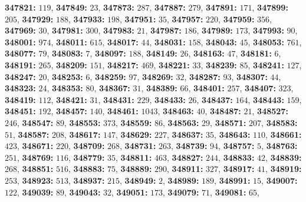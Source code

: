 \textsf{\bfseries 347821:} $119$, \textsf{\bfseries 347849:} $23$, \textsf{\bfseries 347873:} $287$, \textsf{\bfseries 347887:} $279$, \textsf{\bfseries 347891:} $171$, \textsf{\bfseries 347899:} $205$, \textsf{\bfseries 347929:} $188$, \textsf{\bfseries 347933:} $198$, \textsf{\bfseries 347951:} $35$, \textsf{\bfseries 347957:} $220$, \textsf{\bfseries 347959:} $356$, \textsf{\bfseries 347969:} $30$, \textsf{\bfseries 347981:} $300$, \textsf{\bfseries 347983:} $21$, \textsf{\bfseries 347987:} $186$, \textsf{\bfseries 347989:} $173$, \textsf{\bfseries 347993:} $90$, \textsf{\bfseries 348001:} $974$, \textsf{\bfseries 348011:} $615$, \textsf{\bfseries 348017:} $44$, \textsf{\bfseries 348031:} $158$, \textsf{\bfseries 348043:} $45$, \textsf{\bfseries 348053:} $761$, \textsf{\bfseries 348077:} $79$, \textsf{\bfseries 348083:} $7$, \textsf{\bfseries 348097:} $188$, \textsf{\bfseries 348149:} $26$, \textsf{\bfseries 348163:} $47$, \textsf{\bfseries 348181:} $6$, \textsf{\bfseries 348191:} $265$, \textsf{\bfseries 348209:} $151$, \textsf{\bfseries 348217:} $469$, \textsf{\bfseries 348221:} $33$, \textsf{\bfseries 348239:} $85$, \textsf{\bfseries 348241:} $127$, \textsf{\bfseries 348247:} $20$, \textsf{\bfseries 348253:} $6$, \textsf{\bfseries 348259:} $97$, \textsf{\bfseries 348269:} $32$, \textsf{\bfseries 348287:} $93$, \textsf{\bfseries 348307:} $44$, \textsf{\bfseries 348323:} $24$, \textsf{\bfseries 348353:} $80$, \textsf{\bfseries 348367:} $31$, \textsf{\bfseries 348389:} $66$, \textsf{\bfseries 348401:} $257$, \textsf{\bfseries 348407:} $323$, \textsf{\bfseries 348419:} $112$, \textsf{\bfseries 348421:} $31$, \textsf{\bfseries 348431:} $229$, \textsf{\bfseries 348433:} $26$, \textsf{\bfseries 348437:} $164$, \textsf{\bfseries 348443:} $159$, \textsf{\bfseries 348451:} $192$, \textsf{\bfseries 348457:} $140$, \textsf{\bfseries 348461:} $1043$, \textsf{\bfseries 348463:} $40$, \textsf{\bfseries 348487:} $21$, \textsf{\bfseries 348527:} $246$, \textsf{\bfseries 348547:} $89$, \textsf{\bfseries 348553:} $373$, \textsf{\bfseries 348559:} $86$, \textsf{\bfseries 348563:} $29$, \textsf{\bfseries 348571:} $207$, \textsf{\bfseries 348583:} $51$, \textsf{\bfseries 348587:} $208$, \textsf{\bfseries 348617:} $147$, \textsf{\bfseries 348629:} $227$, \textsf{\bfseries 348637:} $35$, \textsf{\bfseries 348643:} $110$, \textsf{\bfseries 348661:} $423$, \textsf{\bfseries 348671:} $220$, \textsf{\bfseries 348709:} $268$, \textsf{\bfseries 348731:} $263$, \textsf{\bfseries 348739:} $94$, \textsf{\bfseries 348757:} $5$, \textsf{\bfseries 348763:} $251$, \textsf{\bfseries 348769:} $116$, \textsf{\bfseries 348779:} $35$, \textsf{\bfseries 348811:} $463$, \textsf{\bfseries 348827:} $244$, \textsf{\bfseries 348833:} $42$, \textsf{\bfseries 348839:} $268$, \textsf{\bfseries 348851:} $516$, \textsf{\bfseries 348883:} $75$, \textsf{\bfseries 348889:} $290$, \textsf{\bfseries 348911:} $327$, \textsf{\bfseries 348917:} $41$, \textsf{\bfseries 348919:} $253$, \textsf{\bfseries 348923:} $513$, \textsf{\bfseries 348937:} $215$, \textsf{\bfseries 348949:} $2$, \textsf{\bfseries 348989:} $189$, \textsf{\bfseries 348991:} $15$, \textsf{\bfseries 349007:} $122$, \textsf{\bfseries 349039:} $89$, \textsf{\bfseries 349043:} $32$, \textsf{\bfseries 349051:} $173$, \textsf{\bfseries 349079:} $71$, \textsf{\bfseries 349081:} $65$, 
